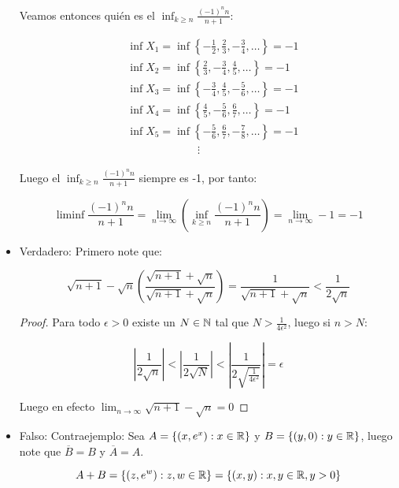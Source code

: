 \begin{itemize}[label={✎},leftmargin=*]
        Veamos entonces quién es el $\inf_{k\geq n} \frac{(-1)^nn}{n+1}$:

        \begin{align*}
            &\inf X_1=\inf \left\{-\frac{1}{2},\frac{2}{3},-\frac{3}{4},\ldots\right\}=-1\\
            &\inf X_2=\inf \left\{\frac{2}{3},-\frac{3}{4},\frac{4}{5},\ldots\right\}=-1\\
            &\inf X_3=\inf \left\{-\frac{3}{4},\frac{4}{5},-\frac{5}{6},\ldots\right\}=-1\\
            &\inf X_4=\inf \left\{\frac{4}{5},-\frac{5}{6},\frac{6}{7},\ldots\right\}=-1\\
            &\inf X_5=\inf \left\{-\frac{5}{6},\frac{6}{7},-\frac{7}{8},\ldots\right\}=-1\\
            & \mathrel{\phantom{=askaldfjasl}}\vdots
        \end{align*}

        Luego el $\inf_{k\geq n} \frac{(-1)^nn}{n+1}$ siempre es -1, por tanto:

        $$\liminf \frac{(-1)^n n}{n+1}=\lim _{n \rightarrow \infty}\left(\inf_{k \geq n} \frac{(-1)^nn}{n+1}\right)=\lim_{n \to \infty} -1=-1$$




    \item Verdadero: Primero note que:

    $$\sqrt{n+1}-\sqrt{n} \left(\frac{\sqrt{n+1}+\sqrt{n}  }{\sqrt{n+1}+\sqrt{n} } \right)=\frac{1}{\sqrt{n+1}+\sqrt{n}}<\frac{1}{2\sqrt{n}}$$


    \begin{proof}
    
    Para todo $\epsilon>0$ existe un  $N\in  \mathbb{N}$ tal que $N>\frac{1}{4\epsilon^2}$, luego si $n>N$:

        $$\left|\frac{1}{2\sqrt{n} }\right|<\left|\frac{1}{2\sqrt{N} }\right|<\left|\frac{1}{2\sqrt{\frac{1}{4\epsilon^2}} }\right|=\epsilon$$


Luego en efecto $\lim_{n \to \infty} \sqrt{n+1}-\sqrt{n}=0   $
    \end{proof}

    

    \item Falso: Contraejemplo: Sea $A=\{(x,e^x) : x\in \mathbb{R}\}$ y $B=\{(y,0): y\in \mathbb{R}\}$, luego note que $\overline{B}=B$ y $\overline{A}=A$.

    $$A+B=\{(z,e^w): z,w\in \mathbb{R}\}=\{(x,y): x,y\in \mathbb{R}, y>0 \}$$


\end{itemize}
